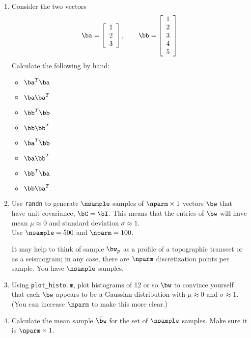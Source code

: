 \documentclass[11pt,titlepage,fleqn]{article}
\begin{document}
\begin{enumerate}
\item Consider the two vectors
%
\begin{equation*}
\ba =  \left[ \begin{array}{r} 1 \\ 2 \\ 3 \end{array} \right],
\quad\quad
\bb =  \left[ \begin{array}{r} 1 \\ 2 \\ 3 \\ 4 \\ 5 \end{array} \right]
\end{equation*}
%
Calculate the following by hand:
%
\begin{itemize}
\item $\ba^T \ba$
\item $\ba \ba^T$
\item $\bb^T \bb$
\item $\bb \bb^T$
\item $\ba^T \bb$
\item $\ba \bb^T$
\item $\bb^T \ba$
\item $\bb \ba^T$
\end{itemize}

\item Use \verb+randn+ to generate $\nsample$ samples of $\nparm \times 1$ vectors $\bw$ that have unit covariance, $\bC = \bI$.
This means that the entries of $\bw$ will have mean $\mu \approx 0$ and standard deviation $\sigma \approx 1$. \\
Use $\nsample = 500$ and $\nparm = 100$.

It may help to think of sample $\bw_p$ as a profile of a topographic transect or as a seismogram; in any case, there are $\nparm$ discretization points per sample. You have $\nsample$ samples.

\item Using \verb+plot_histo.m+, plot histograms of 12 or so $\bw$ to convince yourself that each $\bw$ appears to be a Gaussian distribution with $\mu \approx 0$ and $\sigma \approx 1$. (You can increase $\nparm$ to make this more clear.)

\item Calculate the mean sample $\bar{\bw}$ for the set of $\nsample$ samples. Make sure it is $\nparm \times 1$.


\end{enumerate}
\end{document}
